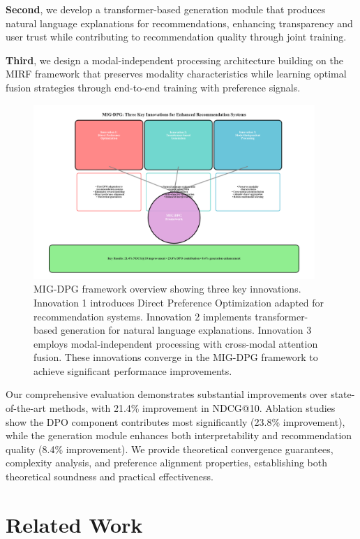 \documentclass[pdflatex,sn-mathphys-num]{sn-jnl}%
\theoremstyle{thmstyleone}%
\theoremstyle{thmstyletwo}%
\theoremstyle{thmstylethree}%
\begin{document}
\textbf{Second}, we develop a transformer-based generation module that produces natural language explanations for recommendations, enhancing transparency and user trust while contributing to recommendation quality through joint training.

\textbf{Third}, we design a modal-independent processing architecture building on the MIRF framework \cite{wei2022freedom} that preserves modality characteristics while learning optimal fusion strategies through end-to-end training with preference signals.

\begin{figure}[H]
\centering
\includegraphics[width=0.95\textwidth]{figures/innovation_overview_new.pdf}
\caption{MIG-DPG framework overview showing three key innovations. Innovation 1 introduces Direct Preference Optimization adapted for recommendation systems. Innovation 2 implements transformer-based generation for natural language explanations. Innovation 3 employs modal-independent processing with cross-modal attention fusion. These innovations converge in the MIG-DPG framework to achieve significant performance improvements.}
\label{fig:innovation_overview}
\end{figure}

Our comprehensive evaluation demonstrates substantial improvements over state-of-the-art methods, with 21.4\% improvement in NDCG@10. Ablation studies show the DPO component contributes most significantly (23.8\% improvement), while the generation module enhances both interpretability and recommendation quality (8.4\% improvement). We provide theoretical convergence guarantees, complexity analysis, and preference alignment properties, establishing both theoretical soundness and practical effectiveness.

\section{Related Work}\label{sec:related}
\end{document}
